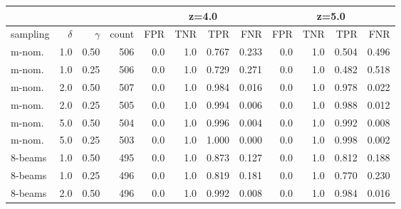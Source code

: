\documentclass{article}
\theoremstyle{plain}
\theoremstyle{definition}
\theoremstyle{remark}
\begin{document}
\begin{table}[h]
\small
\centering
\begin{tabular}{lrrrrrrrrrrr}
\toprule
&&&&\multicolumn{4}{c}{z=4.0} & \multicolumn{4}{c}{z=5.0}\\
\midrule
sampling & $\delta$ & $\gamma$ & count &  FPR &  TNR &  TPR &  FNR &  FPR &  TNR &  TPR &  FNR \\\midrule
    m-nom. &    1.0 &   0.50 &    506 &                  0.0 &                  1.0 &            0.767 &            0.233 &                  0.0 &                  1.0 &            0.504 &            0.496 \\
         m-nom. &    1.0 &   0.25 &    506 &                  0.0 &                  1.0 &            0.729 &            0.271 &                  0.0 &                  1.0 &            0.482 &            0.518 \\
         m-nom. &    2.0 &   0.50 &    507 &                  0.0 &                  1.0 &            0.984 &            0.016 &                  0.0 &                  1.0 &            0.978 &            0.022 \\
         m-nom. &    2.0 &   0.25 &    505 &                  0.0 &                  1.0 &            0.994 &            0.006 &                  0.0 &                  1.0 &            0.988 &            0.012 \\
         m-nom. &    5.0 &   0.50 &    504 &                  0.0 &                  1.0 &            0.996 &            0.004 &                  0.0 &                  1.0 &            0.992 &            0.008 \\
         m-nom. &    5.0 &   0.25 &    503 &                  0.0 &                  1.0 &            1.000 &            0.000 &                  0.0 &                  1.0 &            0.998 &            0.002 \\
         8-beams &    1.0 &   0.50 &    495 &                  0.0 &                  1.0 &            0.873 &            0.127 &                  0.0 &                  1.0 &            0.812 &            0.188 \\
        8-beams &    1.0 &   0.25 &    496 &                  0.0 &                  1.0 &            0.819 &            0.181 &                  0.0 &                  1.0 &            0.770 &            0.230 \\
        8-beams &    2.0 &   0.50 &    496 &                  0.0 &                  1.0 &            0.992 &            0.008 &                  0.0 &                  1.0 &            0.984 &            0.016 \\

\end{tabular}
\end{table}
\end{document}
